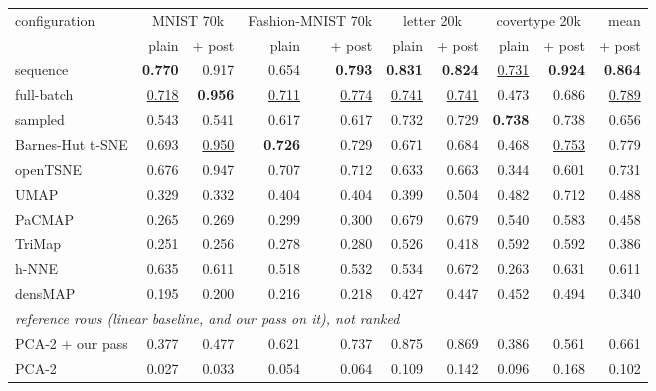 \begin{tabular}{lrrrrrrrrr}
\toprule
configuration & \multicolumn{2}{c}{MNIST 70k} & \multicolumn{2}{c}{Fashion-MNIST 70k} & \multicolumn{2}{c}{letter 20k} & \multicolumn{2}{c}{covertype 20k} & mean \\
 & plain & + post & plain & + post & plain & + post & plain & + post & + post \\
\midrule
\magnet{} sequence & \textbf{0.770} & 0.917 & 0.654 & \textbf{0.793} & \textbf{0.831} & \textbf{0.824} & \underline{0.731} & \textbf{0.924} & \textbf{0.864} \\
\magnet{} full-batch & \underline{0.718} & \textbf{0.956} & \underline{0.711} & \underline{0.774} & \underline{0.741} & \underline{0.741} & 0.473 & 0.686 & \underline{0.789} \\
\magnet{} sampled & 0.543 & 0.541 & 0.617 & 0.617 & 0.732 & 0.729 & \textbf{0.738} & 0.738 & 0.656 \\
Barnes-Hut t-SNE & 0.693 & \underline{0.950} & \textbf{0.726} & 0.729 & 0.671 & 0.684 & 0.468 & \underline{0.753} & 0.779 \\
openTSNE & 0.676 & 0.947 & 0.707 & 0.712 & 0.633 & 0.663 & 0.344 & 0.601 & 0.731 \\
UMAP & 0.329 & 0.332 & 0.404 & 0.404 & 0.399 & 0.504 & 0.482 & 0.712 & 0.488 \\
PaCMAP & 0.265 & 0.269 & 0.299 & 0.300 & 0.679 & 0.679 & 0.540 & 0.583 & 0.458 \\
TriMap & 0.251 & 0.256 & 0.278 & 0.280 & 0.526 & 0.418 & 0.592 & 0.592 & 0.386 \\
h-NNE & 0.635 & 0.611 & 0.518 & 0.532 & 0.534 & 0.672 & 0.263 & 0.631 & 0.611 \\
densMAP & 0.195 & 0.200 & 0.216 & 0.218 & 0.427 & 0.447 & 0.452 & 0.494 & 0.340 \\
\midrule
\multicolumn{10}{l}{\emph{reference rows (linear baseline, and our pass on it), not ranked}} \\
PCA-2 + our pass & 0.377 & 0.477 & 0.621 & 0.737 & 0.875 & 0.869 & 0.386 & 0.561 & 0.661 \\
PCA-2 & 0.027 & 0.033 & 0.054 & 0.064 & 0.109 & 0.142 & 0.096 & 0.168 & 0.102 \\
\bottomrule
\end{tabular}
